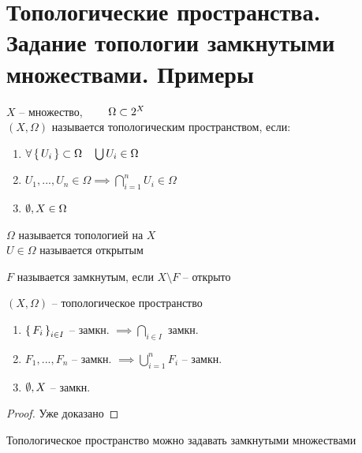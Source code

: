 \section{Топологические пространства. Задание топологии замкнутыми множествами. Примеры}

\begin{definition}
	$ X $ -- множество, $ \qquad \Omega \subset 2^X $ \\
	$ (X, \Omega) $ называется топологическим пространством, если:
	\begin{enumerate}
		\item $ \forall \set{U_i} \subset \Omega \quad \bigcup U_i \in \Omega $
		\item $ U_1, ..., U_n \in \Omega \implies \bigcap_{i = 1}^n U_i \in \Omega $
		\item $ \emptyset, X \in \Omega $
	\end{enumerate}
	$ \Omega $ называется топологией на $ X $ \\
	$ U \in \Omega $ называется открытым
\end{definition}

\begin{definition}
	$ F $ называется замкнутым, если $ X \setminus F $ -- открыто
\end{definition}

\begin{theorem}
	$ (X, \Omega) $ -- топологическое пространство
	\begin{enumerate}
		\item $ \set{F_i}_{i \in I} $ -- замкн. $ \implies \bigcap_{i \in I} $ замкн.
		\item $ F_1, ..., F_n $ -- замкн. $ \implies \bigcup_{i = 1}^n F_i $ -- замкн.
		\item $ \emptyset, X $ -- замкн.
	\end{enumerate}
\end{theorem}

\begin{proof}
	Уже доказано
\end{proof}

\begin{remark}
	Топологическое пространство можно задавать замкнутыми множествами
\end{remark}

